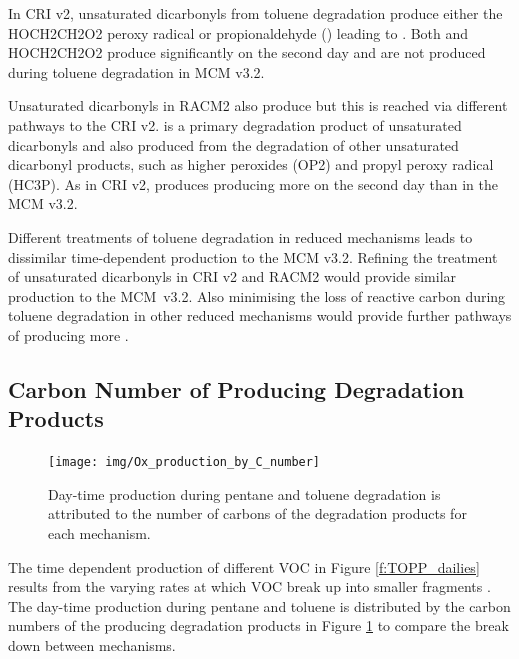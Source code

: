 In CRI v2, unsaturated dicarbonyls from toluene degradation produce either the HOCH2CH2O2 peroxy radical or propionaldehyde () leading to .
Both  and HOCH2CH2O2 produce  significantly on the second day and are not produced during toluene degradation in MCM v3.2.

Unsaturated dicarbonyls in RACM2 also produce  but this is reached via different pathways to the CRI v2.
 is a primary degradation product of unsaturated dicarbonyls and also produced from the degradation of other unsaturated dicarbonyl products, such as higher peroxides (OP2) and propyl peroxy radical (HC3P).
As in CRI v2,  produces  producing more  on the second day than in the MCM v3.2.

Different treatments of toluene degradation in reduced mechanisms leads to dissimilar time-dependent  production to the MCM v3.2.
Refining the treatment of unsaturated dicarbonyls in CRI v2 and RACM2 would provide similar  production to the \mbox{MCM v3.2}.
Also minimising the loss of reactive carbon during toluene degradation in other reduced mechanisms would provide further pathways of producing more .

\subsection[Carbon Number of Ox Producing Degradation Products]{Carbon Number of  Producing Degradation Products} \label{ss:c_number} %

\begin{figure}
    \centering
    \texttt{[image: img/Ox\_production\_by\_C\_number]}
    \vspace{0mm}
    \caption{Day-time  production during pentane and toluene degradation is attributed to the number of carbons of the degradation products for each mechanism.}
    \vspace{-4mm}
    \label{f:carbon}
\end{figure}

The time dependent  production of different VOC in Figure \ref{f:TOPP_dailies} results from the varying rates at which VOC break up into smaller fragments \citep{Butler:2011}.
The day-time  production during pentane and toluene is distributed by the carbon numbers of the  producing degradation products in Figure \ref{f:carbon} to compare the break down between mechanisms.

